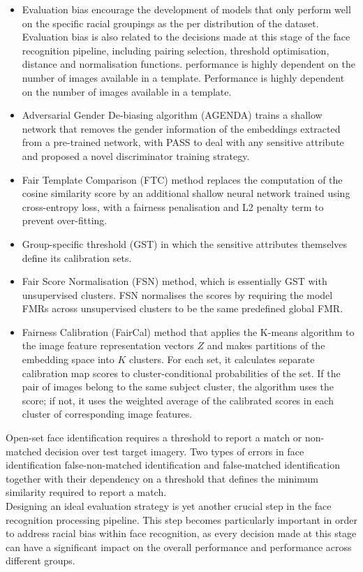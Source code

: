 \documentclass[12pt]{article}
\begin{document}
\begin{itemize}
  \item Evaluation bias encourage the development of models that only perform
  well on the specific racial groupings as the per distribution of the dataset. Evaluation bias is also related to
  the decisions made at this stage of the face recognition pipeline, including pairing selection, threshold optimisation,
  distance and normalisation functions. performance is highly dependent on the number
of images available in a template. Performance is highly dependent on the number
of images available in a template. 
  \item Adversarial Gender De-biasing algorithm (AGENDA) trains a shallow network that removes the gender information of the embeddings extracted from
  a pre-trained network, with PASS to deal with any sensitive attribute and proposed
  a novel discriminator training strategy.
  \item Fair Template Comparison (FTC)
  method replaces the computation of the cosine similarity score by an additional shallow neural network trained
  using cross-entropy loss, with a fairness penalisation and L2 penalty term to prevent over-fitting.
  \item Group-specific threshold (GST) in which the sensitive attributes themselves
  define its calibration sets.
  \item Fair Score Normalisation (FSN) method, which is essentially
  GST with unsupervised clusters. FSN normalises the scores by requiring the model FMRs across unsupervised clusters
  to be the same predefined global FMR.
  \item  Fairness Calibration (FairCal) method that applies
  the K-means algorithm to the image feature representation vectors $Z$ and makes partitions of the embedding space
  into $K$ clusters. For each set, it calculates separate calibration map scores to cluster-conditional probabilities of the
  set. If the pair of images belong to the same subject cluster, the algorithm uses the score; if not, it uses the weighted
  average of the calibrated scores in each cluster of corresponding image features.
\end{itemize}
Open-set face identification requires a threshold to report a match or non-matched
decision over test target imagery. Two types of errors in face identification
false-non-matched identification and false-matched identification together with their dependency on a threshold that
defines the minimum similarity required to report a match.\\
Designing an ideal evaluation strategy is yet another crucial step in the face recognition processing pipeline. This
step becomes particularly important in order to address racial bias within face recognition, as every decision made at
this stage can have a significant impact on the overall performance and performance across different groups. 
\end{document}
